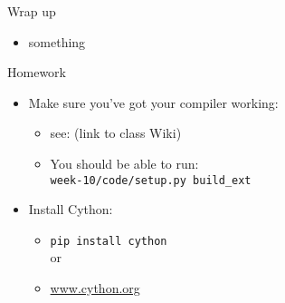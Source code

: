 \documentclass{beamer}
\begin{document}
\begin{frame}{Wrap up}

\begin{itemize}
  \item something
\end{itemize}

\end{frame}



\begin{frame}[fragile]{Homework}

\begin{itemize}
    \item Make sure you've got your compiler working:
    \begin{itemize}
      \item see: (link to class Wiki)
      \item You should be able to run: \\
            \verb|week-10/code/setup.py build_ext|
    \end{itemize}
    \item Install Cython:
    \begin{itemize}
      \item \verb|pip install cython|\\
        or
      \item \url{www.cython.org}
    \end{itemize}

\end{itemize}

\end{frame}
\end{document}
